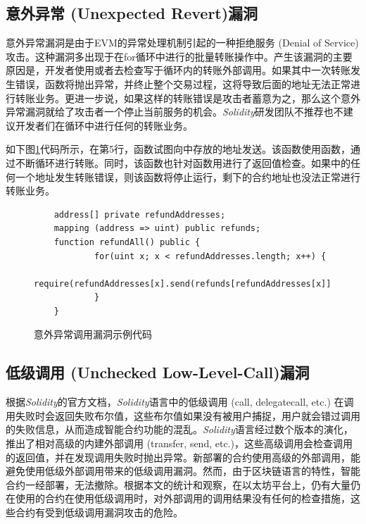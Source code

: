 \subsection{意外异常 (Unexpected Revert)漏洞}

意外异常漏洞是由于EVM的异常处理机制引起的一种拒绝服务 (Denial of Service) 攻击。这种漏洞多出现于在for循环中进行的批量转账操作中。产生该漏洞的主要原因是，开发者使用或者去检查写于循环内的转账外部调用。如果其中一次转账发生错误，函数将抛出异常，并终止整个交易过程，这将导致后面的地址无法正常进行转账业务。更进一步说，如果这样的转账错误是攻击者蓄意为之，那么这个意外异常漏洞就给了攻击者一个停止当前服务的机会。\emph{Solidity}研发团队不推荐也不建议开发者们在循环中进行任何的转账业务。

如下图\ref{fig:revert_vul}代码所示，在第5行，函数试图向中存放的地址发送。该函数使用函数，通过不断循环进行转账。同时，该函数也针对函数用进行了返回值检查。如果中的任何一个地址发生转账错误，则该函数将停止运行，剩下的合约地址也没法正常进行转账业务。

\begin{figure}
\begin{minipage}[htb]{1.0\linewidth}
    \begin{lstlisting}
    address[] private refundAddresses;
    mapping (address => uint) public refunds;
    function refundAll() public {
            for(uint x; x < refundAddresses.length; x++) {
                require(refundAddresses[x].send(refunds[refundAddresses[x]]));
            }
    }
    \end{lstlisting}
\end{minipage}
\vspace{-5mm}
\caption{意外异常调用漏洞示例代码}
\label{fig:revert_vul}
\end{figure}


\subsection{低级调用 (Unchecked Low-Level-Call)漏洞}

根据\emph{Solidity}的官方文档，\emph{Solidity}语言中的低级调用 (call, delegatecall, etc.) 在调用失败时会返回失败布尔值，这些布尔值如果没有被用户捕捉，用户就会错过调用的失败信息，从而造成智能合约功能的混乱。\emph{Solidity}语言经过数个版本的演化，推出了相对高级的内建外部调用 (transfer, send, etc.)，这些高级调用会检查调用的返回值，并在发现调用失败时抛出异常。新部署的合约使用高级的外部调用，能避免使用低级外部调用带来的低级调用漏洞。然而，由于区块链语言的特性，智能合约一经部署，无法撤除。根据本文的统计和观察，在以太坊平台上，仍有大量仍在使用的合约在使用低级调用时，对外部调用的调用结果没有任何的检查措施，这些合约有受到低级调用漏洞攻击的危险。


